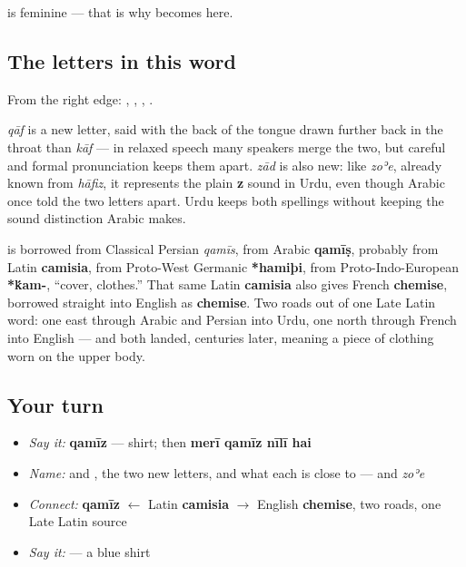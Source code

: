 \textbf{} is feminine — that is why \textbf{} becomes \textbf{} here.

\subsection*{The letters in this word}
From the right edge: \textbf{}, \textbf{}, \textbf{}, \textbf{}.

\textbf{} \emph{qāf} is a new letter, said with the back of the tongue drawn further back in the throat than \textbf{} \emph{kāf} — in relaxed speech many speakers merge the two, but careful and formal pronunciation keeps them apart. \textbf{} \emph{zād} is also new: like \emph{zoʾe}, already known from \emph{hāfiz}, it represents the plain \textbf{z} sound in Urdu, even though Arabic once told the two letters apart. Urdu keeps both spellings without keeping the sound distinction Arabic makes.

\begin{cousinweb}
\textbf{} is borrowed from Classical Persian \emph{qamīs}, from Arabic \textbf{qamīṣ}, probably from Latin \textbf{camisia}, from Proto-West Germanic \textbf{*hamiþi}, from Proto-Indo-European \textbf{*\'{k}am-}, \textquotedblleft{}cover, clothes.\textquotedblright{} That same Latin \textbf{camisia} also gives French \textbf{chemise}, borrowed straight into English as \textbf{chemise}. Two roads out of one Late Latin word: one east through Arabic and Persian into Urdu, one north through French into English — and both landed, centuries later, meaning a piece of clothing worn on the upper body.
\end{cousinweb}

\subsection*{Your turn}
\begin{itemize}
\raggedright
  \item \emph{Say it:} \textbf{qamīz} — shirt; then \textbf{merī qamīz nīlī hai}
  \item \emph{Name:} \textbf{} and \textbf{}, the two new letters, and what each is close to — \textbf{} and \emph{zoʾe}
  \item \emph{Connect:} \textbf{qamīz} $\leftarrow$ Latin \textbf{camisia} $\to$ English \textbf{chemise}, two roads, one Late Latin source
  \item \emph{Say it:} \textbf{ } — a blue shirt
\end{itemize}

